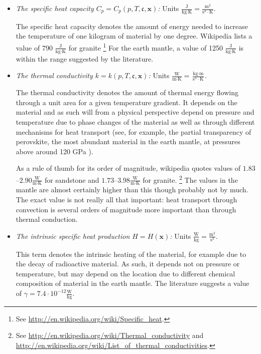\documentclass{article}
\begin{document}
\begin{itemize}
\item \textit{The specific heat capacity $C_p=C_p(p,T,\mathfrak c,\mathbf x)$:}
Units $\frac{\textrm{J}}{\textrm{kg}\cdot\textrm{K}} =
  \frac{\textrm{m}^2}{\textrm{s}^2\cdot\textrm{K}}$.

  The specific heat capacity denotes the amount of energy needed to increase
  the temperature of one kilogram of material by one degree. Wikipedia lists a
  value of 790 $\frac{\textrm{J}}{\textrm{kg}\cdot\textrm{K}}$ for granite%
  \footnote{See \url{http://en.wikipedia.org/wiki/Specific_heat}.}
  For the earth mantle, a value of 1250
  $\frac{\textrm{J}}{\textrm{kg}\cdot\textrm{K}}$ is within the range
  suggested by the literature.


\item \textit{The thermal conductivity $k=k(p,T,\mathfrak c,\mathbf x)$:} Units
  $\frac{\textrm{W}}{\textrm{m}\cdot\textrm{K}}=\frac{\textrm{kg}\cdot\textrm{m}}{\textrm{s}^3\cdot\textrm{K}}$.

  The thermal conductivity denotes the amount of thermal energy flowing
  through a unit area for a given temperature gradient. It depends on the
  material and as such will from a physical perspective depend on pressure and
  temperature due to phase changes of the material as well as through
  different mechanisms for heat transport (see, for example, the partial
  transparency of perovskite, the most abundant
  material in the earth mantle, at pressures above around 120 GPa
  \cite{BRVMFG04}).

  As a rule of thumb for its
  order of magnitude, wikipedia quotes values of
  $1.83$--$2.90\frac{\textrm{W}}{\textrm{m}\cdot\textrm{K}}$ for sandstone and
  $1.73$--$3.98\frac{\textrm{W}}{\textrm{m}\cdot\textrm{K}}$ for granite.%
  \footnote{See \url{http://en.wikipedia.org/wiki/Thermal_conductivity} and
    \url{http://en.wikipedia.org/wiki/List_of_thermal_conductivities}.} The
  values in the mantle are almost certainly higher than this though probably
  not by much. The exact value is not really all that important: heat
  transport through convection is several orders of magnitude more important
  than through thermal conduction.

\item \textit{The intrinsic specific heat production $H=H(\mathbf x)$:} Units
  $\frac{\textrm{W}}{\textrm{kg}}=\frac{\textrm{m}^2}{\textrm{s}^3}$.

  This term denotes the intrinsic heating of the material, for example due to
  the decay of radioactive material. As such, it depends not on pressure or
  temperature, but may depend on the location due to different chemical
  composition of material in the earth mantle. The literature suggests a value
  of $\gamma=7.4\cdot 10^{-12}\frac{\textrm{W}}{\textrm{kg}}$.
\end{itemize}
\end{document}
